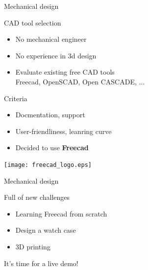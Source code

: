\documentclass[compress,red]{beamer}
\begin{document}
\begin{frame}{Mechanical design}

  CAD tool selection

  \begin{itemize}
  \item No mechanical engineer
  \item No experience in 3d design
  \item Evaluate existing free CAD tools \\
    Freecad, OpenSCAD, Open CASCADE, ...
  \end{itemize}

  \pause
  Criteria

  \begin{itemize}
  \item Docmentation, support
  \item User-friendliness, leanring curve
  \end{itemize}

  \pause
  \begin{itemize}
  \item Decided to use \textbf{Freecad}
  \end{itemize}

  \begin{center}
    \texttt{[image: freecad\_logo.eps]}
  \end{center}

  \note{}

\end{frame}

\begin{frame}{Mechanical design}

  Full of new challenges

  \begin{itemize}
  \item Learning Freecad from scratch
  \item Design a watch case
  \item 3D printing
  \end{itemize}

  \pause
  \vskip 6mm
  It's time for a live demo!


\end{frame}
\end{document}
